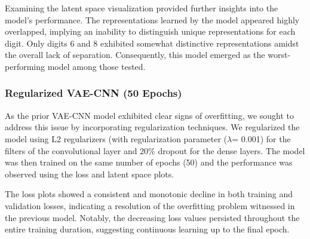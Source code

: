 \documentclass[12pt]{article}
\begin{document}
Examining the latent space visualization provided further insights into the model's performance. The representations learned by the model appeared highly overlapped, implying an inability to distinguish unique representations for each digit. Only digits 6 and 8 exhibited somewhat distinctive representations amidst the overall lack of separation. Consequently, this model emerged as the worst-performing model among those tested.

\subsubsection{Regularized VAE-CNN (50 Epochs)}
As the prior VAE-CNN model exhibited clear signs of overfitting, we sought to address this issue by incorporating regularization techniques. We regularized the model using L2 regularizers (with regularization parameter (\(\lambda\)= 0.001) for the filters of the convolutional layer and 20\% dropout for the dense layers. The model was then trained on the same number of epochs (50) and the performance was observed using the loss and latent space plots.

The loss plots showed a consistent and monotonic decline in both training and validation losses, indicating a resolution of the overfitting problem witnessed in the previous model. Notably, the decreasing loss values persisted throughout the entire training duration, suggesting continuous learning up to the final epoch.
\end{document}
